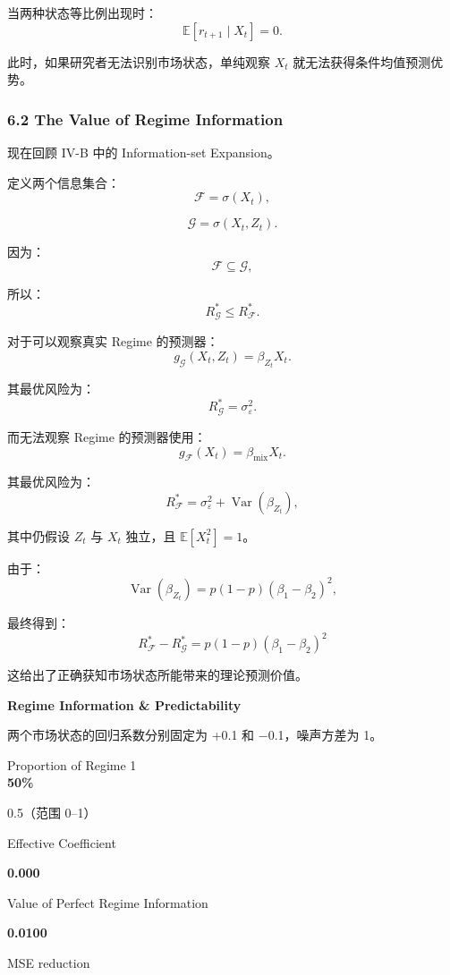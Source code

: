 当两种状态等比例出现时：
\[\mathbb E[r_{t+1}\mid X_t]=0.\]

此时，如果研究者无法识别市场状态，单纯观察 \(X_t\) 就无法获得条件均值预测优势。

\hypertarget{part-4-77-0001-the-value-of-regime-information}{%
\subsubsection{6.2 The Value of Regime Information}\label{part-4-77-0001-the-value-of-regime-information}}

现在回顾 IV-B 中的 Information-set Expansion。

定义两个信息集合：
\[\mathcal F=\sigma(X_t),\]

\[\mathcal G=\sigma(X_t,Z_t).\]

因为：
\[\mathcal F\subseteq\mathcal G,\]

所以：
\[R_{\mathcal G}^*\leq R_{\mathcal F}^*.\]

对于可以观察真实 Regime 的预测器：
\[g_{\mathcal G}(X_t,Z_t)=\beta_{Z_t}X_t.\]

其最优风险为：
\[R_{\mathcal G}^*=\sigma_\varepsilon^2.\]

而无法观察 Regime 的预测器使用：
\[g_{\mathcal F}(X_t)=\beta_{\mathrm{mix}}X_t.\]

其最优风险为：
\[R_{\mathcal F}^*
=
\sigma_\varepsilon^2+
\operatorname{Var}(\beta_{Z_t}),\]

其中仍假设 \(Z_t\) 与 \(X_t\) 独立，且 \(\mathbb E[X_t^2]=1\)。

由于：
\[\operatorname{Var}(\beta_{Z_t})
=
p(1-p)(\beta_1-\beta_2)^2,\]

最终得到：
\[\boxed{
R_{\mathcal F}^*-R_{\mathcal G}^*
=
p(1-p)(\beta_1-\beta_2)^2
}\]

这给出了正确获知市场状态所能带来的理论预测价值。

\textbf{Regime Information \& Predictability}

两个市场状态的回归系数分别固定为 +0.1 和 −0.1，噪声方差为 1。

Proportion of Regime 1\\
\textbf{50\%}

0.5（范围 0--1）

Effective Coefficient

\textbf{0.000}

Value of Perfect Regime Information

\textbf{0.0100}

MSE reduction

